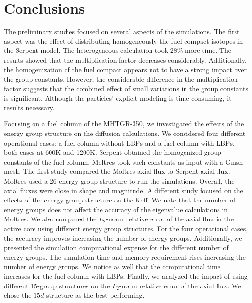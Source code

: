 \documentclass[11pt,letterpaper]{article}
\begin{document}
\section{Conclusions}

The preliminary studies focused on several aspects of the simulations.
The first aspect was the effect of distributing homogeneously the fuel compact isotopes in the Serpent model.
The heterogeneous calculation took 28$\%$ more time.
The results showed that the multiplication factor decreases considerably.
Additionally, the homogenization of the fuel compact appears not to have a strong impact over the group constants.
However, the considerable difference in the multiplication factor suggests that the combined effect of small variations in the group constants is significant.
Although the particles’ explicit modeling is time-consuming, it results necessary.


Focusing on a fuel column of the MHTGR-350, we investigated the effects of the energy group structure on the diffusion calculations.
We considered four different operational cases: a fuel column without LBPs and a fuel column with LBPs, both cases at 600K and 1200K.
Serpent obtained the homogenized group constants of the fuel column.
Moltres took such constants as input with a Gmsh mesh.
The first study compared the Moltres axial flux to Serpent axial flux.
Moltres used a 26 energy group structure to run the simulations.
Overall, the axial fluxes were close in shape and magnitude.
A different study focused on the effects of the energy group structure on the \gls{Keff}.
We note that the number of energy groups does not affect the accuracy of the eigenvalue calculations in Moltres.
We also compared the $L_2$-norm relative error of the axial flux in the active core using different energy group structures.
For the four operational cases, the accuracy improves increasing the number of energy groups.
Additionally, we presented the simulation computational expense for the different number of energy groups.
The simulation time and memory requirement rises increasing the number of energy groups.
We notice as well that the computational time increases for the fuel column with LBPs.
Finally, we analyzed the impact of using different 15-group structures on the $L_2$-norm relative error of the axial flux.
We chose the $15d$ structure as the best performing.
\end{document}
